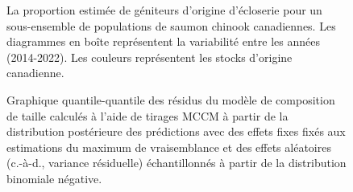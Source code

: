 \begin{figure}[htb]
    \centering
    \caption{La proportion estimée de géniteurs d'origine d'écloserie pour un sous-ensemble de populations de saumon chinook canadiennes. Les diagrammes en boîte représentent la variabilité entre les années (2014-2022). Les couleurs représentent les stocks d'origine canadienne.}
    \label{fig:box-phos}
\end{figure}

\begin{figure}[htb]
    \centering
    \caption{Graphique quantile-quantile des résidus du modèle de composition de taille calculés à l'aide de tirages MCCM à partir de la distribution postérieure des prédictions avec des effets fixes fixés aux estimations du maximum de vraisemblance et des effets aléatoires (c.-à-d., variance résiduelle) échantillonnés à partir de la distribution binomiale négative.}
    \label{fig:qqplot-size}
\end{figure}

